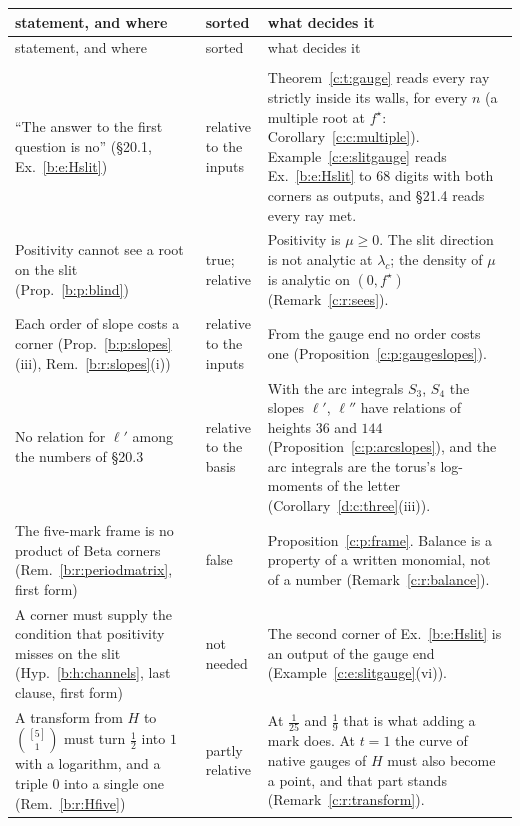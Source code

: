 \documentclass[11pt]{article}
\theoremstyle{plain}
\theoremstyle{definition}
\theoremstyle{remark}
\begin{document}
{\small
\renewcommand{\arraystretch}{1.15}
\begin{longtable}{@{}>{\raggedright}p{4.5cm} >{\raggedright}p{2.3cm} >{\raggedright\arraybackslash}p{8.2cm}@{}}
\toprule
statement, and where & sorted & what decides it\\ \midrule
\endfirsthead
\toprule
statement, and where & sorted & what decides it\\ \midrule
\endhead
\multicolumn{3}{@{}l}{\emph{The negatives of \S20}}\\[2pt]
``The answer to the first question is no'' (\S20.1, Ex.~\ref{b:e:Hslit}) & relative to the inputs & Theorem~\ref{c:t:gauge} reads every ray strictly inside its walls, for every $n$ (a multiple root at $f^\star$: Corollary~\ref{c:c:multiple}). Example~\ref{c:e:slitgauge} reads Ex.~\ref{b:e:Hslit} to $68$ digits with both corners as outputs, and \S21.4 reads every ray met.\\
Positivity cannot see a root on the slit (Prop.~\ref{b:p:blind}) & true; relative & Positivity is $\mu\ge0$. The slit direction is not analytic at $\lambda_c$; the density of $\mu$ is analytic on $(0,f^\star)$ (Remark~\ref{c:r:sees}).\\
Each order of slope costs a corner (Prop.~\ref{b:p:slopes}(iii), Rem.~\ref{b:r:slopes}(i)) & relative to the inputs & From the gauge end no order costs one (Proposition~\ref{c:p:gaugeslopes}).\\
No relation for $\ell'$ among the numbers of \S20.3 & relative to the basis & With the arc integrals $S_3$, $S_4$ the slopes $\ell'$, $\ell''$ have relations of heights $36$ and $144$ (Proposition~\ref{c:p:arcslopes}), and the arc integrals are the torus's log-moments of the letter (Corollary~\ref{d:c:three}(iii)).\\
The five-mark frame is no product of Beta corners (Rem.~\ref{b:r:periodmatrix}, first form) & false & Proposition~\ref{c:p:frame}. Balance is a property of a written monomial, not of a number (Remark~\ref{c:r:balance}).\\
A corner must supply the condition that positivity misses on the slit (Hyp.~\ref{b:h:channels}, last clause, first form) & not needed & The second corner of Ex.~\ref{b:e:Hslit} is an output of the gauge end (Example~\ref{c:e:slitgauge}(vi)).\\
A transform from $H$ to $\binom{[5]}1$ must turn $\frac12$ into $1$ with a logarithm, and a triple $0$ into a single one (Rem.~\ref{b:r:Hfive}) & partly relative & At $\frac1{25}$ and $\frac19$ that is what adding a mark does. At $t=1$ the curve of native gauges of $H$ must also become a point, and that part stands (Remark~\ref{c:r:transform}).\\

\end{longtable}}
\end{document}
